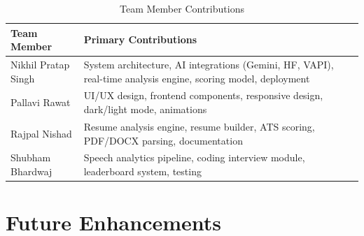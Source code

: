 \documentclass[12pt,a4paper,oneside]{report}
\begin{document}
\begin{table}[H]
\centering
\caption{Team Member Contributions}
\label{tab:contributions}
\begin{tabular}{|p{4cm}|p{9cm}|}
\hline
\textbf{Team Member} & \textbf{Primary Contributions} \\
\hline
Nikhil Pratap Singh & System architecture, AI integrations (Gemini, HF, VAPI), real-time analysis engine, scoring model, deployment \\
\hline
Pallavi Rawat & UI/UX design, frontend components, responsive design, dark/light mode, animations \\
\hline
Rajpal Nishad & Resume analysis engine, resume builder, ATS scoring, PDF/DOCX parsing, documentation \\
\hline
Shubham Bhardwaj & Speech analytics pipeline, coding interview module, leaderboard system, testing \\
\hline
\end{tabular}
\end{table}


\section{Future Enhancements}
\end{document}
